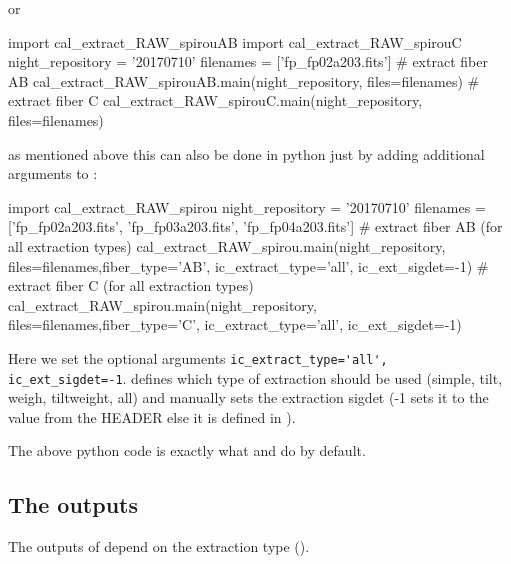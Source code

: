 \noindent or
\begin{pythonbox}
import cal_extract_RAW_spirouAB
import cal_extract_RAW_spirouC
night_repository = '20170710'
filenames = ['fp_fp02a203.fits']
# extract fiber AB
cal_extract_RAW_spirouAB.main(night_repository, files=filenames)
# extract fiber C
cal_extract_RAW_spirouC.main(night_repository, files=filenames)
\end{pythonbox}
\noindent as mentioned above this can also be done in python just by adding additional arguments to \calextractRAW:
\begin{pythonbox}
import cal_extract_RAW_spirou
night_repository = '20170710'
filenames = ['fp_fp02a203.fits', 'fp_fp03a203.fits', 'fp_fp04a203.fits']
# extract fiber AB (for all extraction types)
cal_extract_RAW_spirou.main(night_repository, files=filenames,fiber_type='AB',
                            ic_extract_type='all', ic_ext_sigdet=-1)
# extract fiber C (for all extraction types)
cal_extract_RAW_spirou.main(night_repository, files=filenames,fiber_type='C',
                            ic_extract_type='all', ic_ext_sigdet=-1)
\end{pythonbox}
\begin{note}
Here we set the optional arguments \lstinline[style=pythoninline]|ic_extract_type='all', ic_ext_sigdet=-1|.  defines which type of extraction should be used (simple, tilt, weigh, tiltweight, all) and  manually sets the extraction sigdet (-1 sets it to the value from the HEADER else it is defined in \constantsfile).
\end{note}
\noindent The above python code is exactly what \calextractRAWAB and \calextractRAWC do by default.


\subsection{The outputs}
The outputs of \calextractRAW depend on the extraction type (). 


